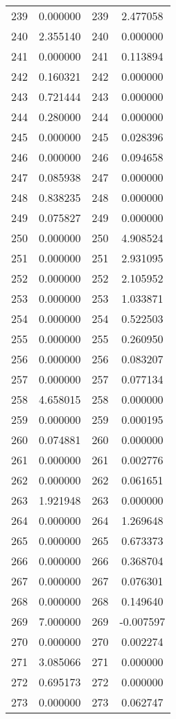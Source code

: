 \documentclass[12pt]{article}
\begin{document}
\begin{longtable}{@{}cccc@{}}
239 & 0.000000 & 239 & 2.477058 \\
240 & 2.355140 & 240 & 0.000000 \\
241 & 0.000000 & 241 & 0.113894 \\
242 & 0.160321 & 242 & 0.000000 \\
243 & 0.721444 & 243 & 0.000000 \\
244 & 0.280000 & 244 & 0.000000 \\
245 & 0.000000 & 245 & 0.028396 \\
246 & 0.000000 & 246 & 0.094658 \\
247 & 0.085938 & 247 & 0.000000 \\
248 & 0.838235 & 248 & 0.000000 \\
249 & 0.075827 & 249 & 0.000000 \\
250 & 0.000000 & 250 & 4.908524 \\
251 & 0.000000 & 251 & 2.931095 \\
252 & 0.000000 & 252 & 2.105952 \\
253 & 0.000000 & 253 & 1.033871 \\
254 & 0.000000 & 254 & 0.522503 \\
255 & 0.000000 & 255 & 0.260950 \\
256 & 0.000000 & 256 & 0.083207 \\
257 & 0.000000 & 257 & 0.077134 \\
258 & 4.658015 & 258 & 0.000000 \\
259 & 0.000000 & 259 & 0.000195 \\
260 & 0.074881 & 260 & 0.000000 \\
261 & 0.000000 & 261 & 0.002776 \\
262 & 0.000000 & 262 & 0.061651 \\
263 & 1.921948 & 263 & 0.000000 \\
264 & 0.000000 & 264 & 1.269648 \\
265 & 0.000000 & 265 & 0.673373 \\
266 & 0.000000 & 266 & 0.368704 \\
267 & 0.000000 & 267 & 0.076301 \\
268 & 0.000000 & 268 & 0.149640 \\
269 & 7.000000 & 269 & -0.007597 \\
270 & 0.000000 & 270 & 0.002274 \\
271 & 3.085066 & 271 & 0.000000 \\
272 & 0.695173 & 272 & 0.000000 \\
273 & 0.000000 & 273 & 0.062747 \\

\end{longtable}
\end{document}
